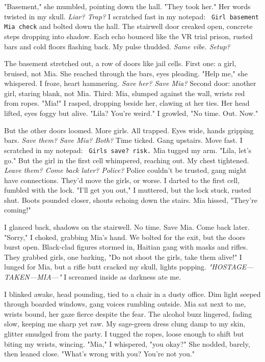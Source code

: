 \documentclass[12pt]{article} %
\newcommand{\note}[1]{\texttt{\small \color{DarkGray} #1}}
\begin{document}
"Basement," she mumbled, pointing down the hall. "They took her." Her words twisted in my skull. \textit{Liar? Trap?} I scratched fast in my notepad: \note{Girl basement Mia check} and bolted down the hall. The stairwell door creaked open, concrete steps dropping into shadow. Each echo bounced like the VR trial prison, rusted bars and cold floors flashing back. My pulse thudded. \textit{Same vibe. Setup?}

The basement stretched out, a row of doors like jail cells. First one: a girl, bruised, not \textnormal{Mia}. She reached through the bars, eyes pleading. "Help me," she whispered. I froze, heart hammering. \textit{Save her? Save \textnormal{Mia}?} Second door: another girl, staring blank, not \textnormal{Mia}. Third: \textnormal{Mia}, slumped against the wall, wrists red from ropes. "\textnormal{Mia}!" I rasped, dropping beside her, clawing at her ties. Her head lifted, eyes foggy but alive. "\textnormal{Lila}? You’re weird." I growled, "No time. Out. Now."

But the other doors loomed. More girls. All trapped. Eyes wide, hands gripping bars. \textit{Save them? Save \textnormal{Mia}? Both?} Time ticked. Gang upstairs. Move fast. I scratched in my notepad: \note{Girls save? risk.} \textnormal{Mia} tugged my arm. "\textnormal{Lila}, let’s go." But the girl in the first cell whimpered, reaching out. My chest tightened. \textit{Leave them? Come back later? Police?} Police couldn’t be trusted, gang might have connections. They’d move the girls, or worse. I darted to the first cell, fumbled with the lock. "I’ll get you out," I muttered, but the lock stuck, rusted shut. Boots pounded closer, shouts echoing down the stairs. \textnormal{Mia} hissed, "They’re coming!"

I glanced back, shadows on the stairwell. No time. Save \textnormal{Mia}. Come back later. "Sorry," I choked, grabbing \textnormal{Mia}’s hand. We bolted for the exit, but the doors burst open. Black-clad figures stormed in, Haitian gang with masks and rifles. They grabbed girls, one barking, "Do not shoot the girls, take them alive!" I lunged for \textnormal{Mia}, but a rifle butt cracked my skull, lights popping. \textit{"HOSTAGE—TAKEN—MIA—"} I screamed inside as darkness ate me.

I blinked awake, head pounding, tied to a chair in a dusty office. Dim light seeped through boarded windows, gang voices rumbling outside. \textnormal{Mia} sat next to me, wrists bound, her gaze fierce despite the fear. The alcohol buzz lingered, fading slow, keeping me sharp yet raw. My sage-green dress clung damp to my skin, glitter smudged from the party. I tugged the ropes, loose enough to shift but biting my wrists, wincing. "\textnormal{Mia}," I whispered, "you okay?" She nodded, barely, then leaned close. "What’s wrong with you? You’re not you."
\end{document}

